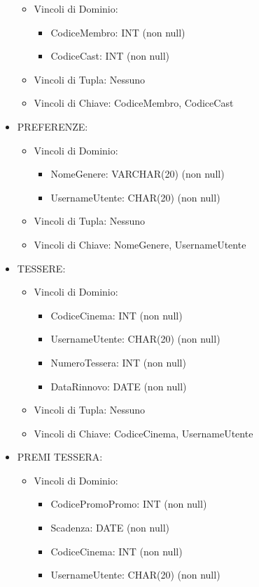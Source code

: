 \documentclass[a4paper,12pt]{report}
\begin{document}
\begin{itemize}
\begin{itemize}
		\item Vincoli di Dominio:
		\begin{itemize}
			\item CodiceMembro: INT (non null)
			\item CodiceCast: INT (non null)
		\end{itemize}
		\item Vincoli di Tupla: Nessuno
		\item Vincoli di Chiave: CodiceMembro, CodiceCast
	\end{itemize}
	\item PREFERENZE:
	\begin{itemize}
		\item Vincoli di Dominio:
		\begin{itemize}
			\item NomeGenere: VARCHAR(20) (non null)
			\item UsernameUtente: CHAR(20) (non null)
		\end{itemize}
		\item Vincoli di Tupla: Nessuno
		\item Vincoli di Chiave: NomeGenere, UsernameUtente
	\end{itemize}
	\item TESSERE:
	\begin{itemize}
		\item Vincoli di Dominio:
		\begin{itemize}
			\item CodiceCinema: INT (non null)
			\item UsernameUtente: CHAR(20) (non null)
			\item NumeroTessera: INT (non null)
			\item DataRinnovo: DATE (non null)
		\end{itemize}
		\item Vincoli di Tupla: Nessuno
		\item Vincoli di Chiave: CodiceCinema, UsernameUtente
	\end{itemize}
	\item PREMI TESSERA:
	\begin{itemize}
		\item Vincoli di Dominio:
		\begin{itemize}
			\item CodicePromoPromo: INT (non null)
			\item Scadenza: DATE (non null)
			\item CodiceCinema: INT (non null)
			\item UsernameUtente: CHAR(20) (non null)

\end{itemize}
\end{itemize}
\end{itemize}
\end{document}
